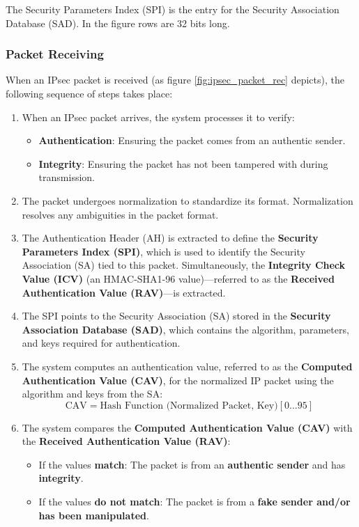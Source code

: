 \begin{tcolorbox}[colback=blue!10!white, colframe=blue!50!white, title=Insight]
The Security Parameters Index (SPI) is the entry for the Security Association Database (SAD). In the figure rows are 32 bits long.
\end{tcolorbox}

\subsubsection{Packet Receiving}

When an IPsec packet is received (as figure \ref{fig:ipsec_packet_rec} depicts), the following sequence of steps takes place:

\begin{enumerate}
    \item When an IPsec packet arrives, the system processes it to verify:
    \begin{itemize}
        \item \textbf{Authentication}: Ensuring the packet comes from an authentic sender.
        \item \textbf{Integrity}: Ensuring the packet has not been tampered with during transmission.
    \end{itemize}
    
    \item The packet undergoes normalization to standardize its format. Normalization resolves any ambiguities in the packet format.
    
    \item The Authentication Header (AH) is extracted to define the \textbf{Security Parameters Index (SPI)}, which is used to identify the Security Association (SA) tied to this packet. Simultaneously, the \textbf{Integrity Check Value (ICV)} (an HMAC-SHA1-96 value)—referred to as the \textbf{Received Authentication Value (RAV)}—is extracted.
    
    \item The SPI points to the Security Association (SA) stored in the \textbf{Security Association Database (SAD)}, which contains the algorithm, parameters, and keys required for authentication.
    
    \item The system computes an authentication value, referred to as the \textbf{Computed Authentication Value (CAV)}, for the normalized IP packet using the algorithm and keys from the SA:
    \[
    \text{CAV} = \text{Hash Function (Normalized Packet, Key)} [0...95]
    \]
    
    \item The system compares the \textbf{Computed Authentication Value (CAV)} with the \textbf{Received Authentication Value (RAV)}:
    \begin{itemize}
        \item If the values \textbf{match}: The packet is from an \textbf{authentic sender} and has \textbf{integrity}.
        \item If the values \textbf{do not match}: The packet is from a \textbf{fake sender and/or has been manipulated}.
    \end{itemize}
\end{enumerate}


